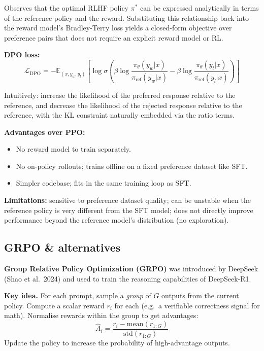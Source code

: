 \begin{paperbox}[title={DPO (Rafailov et al.\ 2023)}]
  Observes that the optimal RLHF policy $\pi^*$ can be expressed analytically in terms
  of the reference policy and the reward. Substituting this relationship back into the
  reward model's Bradley-Terry loss yields a closed-form objective over preference pairs
  that does not require an explicit reward model or RL.
\end{paperbox}

\textbf{DPO loss:}
\[
  \mathcal{L}_\text{DPO} = -\mathbb{E}_{(x,y_w,y_l)}\left[
    \log \sigma\!\left(
      \beta \log \frac{\pi_\theta(y_w|x)}{\pi_\text{ref}(y_w|x)}
      - \beta \log \frac{\pi_\theta(y_l|x)}{\pi_\text{ref}(y_l|x)}
    \right)
  \right]
\]

Intuitively: increase the likelihood of the preferred response relative to the
reference, and decrease the likelihood of the rejected response relative to the
reference, with the KL constraint naturally embedded via the ratio terms.

\textbf{Advantages over PPO:}
\begin{itemize}
  \item No reward model to train separately.
  \item No on-policy rollouts; trains offline on a fixed preference dataset like SFT.
  \item Simpler codebase; fits in the same training loop as SFT.
\end{itemize}

\textbf{Limitations:} sensitive to preference dataset quality; can be unstable when
the reference policy is very different from the SFT model; does not directly improve
performance beyond the reference model's distribution (no exploration).

\subsection{GRPO \& alternatives}

\textbf{Group Relative Policy Optimization (GRPO)} was introduced by DeepSeek (Shao
et al.\ 2024) and used to train the reasoning capabilities of DeepSeek-R1.

\textbf{Key idea.} For each prompt, sample a \emph{group} of $G$ outputs from the
current policy. Compute a scalar reward $r_i$ for each (e.g.\ a verifiable correctness
signal for math). Normalise rewards within the group to get advantages:
\[
  \hat{A}_i = \frac{r_i - \text{mean}(r_{1:G})}{\text{std}(r_{1:G})}
\]
Update the policy to increase the probability of high-advantage outputs.

